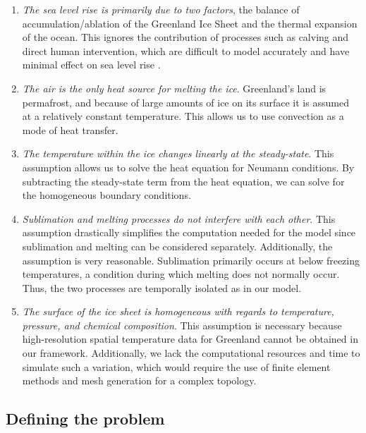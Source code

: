 \documentclass[12pt,a4paper,titlepage]{article}
\begin{document}
\begin{enumerate}

\item \textit{The sea level rise is primarily due to two factors}, the
balance of accumulation/ablation of the Greenland Ice Sheet and
the thermal expansion of the ocean. This ignores the contribution
of processes such as calving and direct human intervention, which
are difficult to model accurately and have minimal effect on sea
level rise .

\item \textit{The air is the only heat source for melting the ice}.
Greenland's land is permafrost, and because of large amounts of
ice on its surface it is assumed at a relatively constant
temperature. This allows us to use convection as a mode of heat
transfer.

\item \textit{The temperature within the ice changes linearly at the
steady-state}. This assumption allows us to solve the heat
equation for Neumann conditions. By subtracting the steady-state
term from the heat equation, we can solve for the homogeneous
boundary conditions.

\item \textit{Sublimation and melting processes do not interfere with each
other}. This assumption drastically simplifies the computation
needed for the model since sublimation and melting can be
considered separately. Additionally, the assumption is very
reasonable. Sublimation primarily occurs at below freezing
temperatures, a condition during which melting does not normally
occur. Thus, the two processes are temporally isolated as in our
model.

\item \textit{The surface of the ice sheet is homogeneous with regards to
temperature, pressure, and chemical composition}. This assumption
is necessary because high-resolution spatial temperature data for
Greenland cannot be obtained in our framework. Additionally, we
lack the computational resources and time to simulate such a
variation, which would require the use of finite element methods
and mesh generation for a complex topology.

\end{enumerate}

\subsection{Defining the problem}
\end{document}
